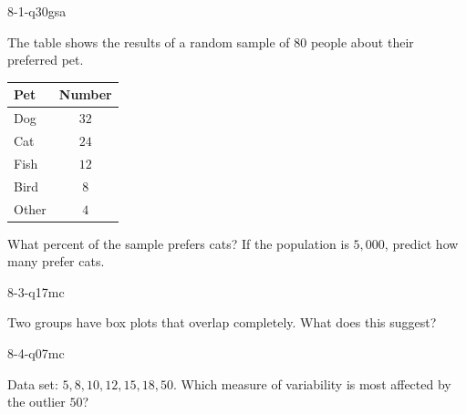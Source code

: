 \begin{practiceQuestion}{8-1-q30}{gsa}
\begin{questionText}
The table shows the results of a random sample of $80$ people about their preferred pet.

\begin{center}
\begin{tabular}{|l|c|}
\hline
\textbf{Pet} & \textbf{Number} \\
\hline
Dog & $32$ \\
\hline
Cat & $24$ \\
\hline
Fish & $12$ \\
\hline
Bird & $8$ \\
\hline
Other & $4$ \\
\hline
\end{tabular}
\end{center}

What percent of the sample prefers cats? If the population is $5{,}000$, predict how many prefer cats.
\end{questionText}
\end{practiceQuestion}

\begin{practiceQuestion}{8-3-q17}{mc}
\begin{questionText}
Two groups have box plots that overlap completely. What does this suggest?
\end{questionText}
\end{practiceQuestion}

\begin{practiceQuestion}{8-4-q07}{mc}
\begin{questionText}
Data set: $5, 8, 10, 12, 15, 18, 50$. Which measure of variability is most affected by the outlier $50$?
\end{questionText}
\end{practiceQuestion}

